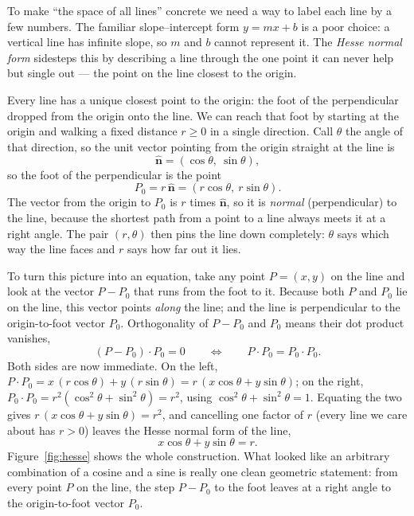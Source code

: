 To make ``the space of all lines'' concrete we need a way to label each line by a
few numbers. The familiar slope--intercept form $y = mx + b$ is a poor choice: a
vertical line has infinite slope, so $m$ and $b$ cannot represent it. The
\emph{Hesse normal form} sidesteps this by describing a line through the one point
it can never help but single out --- the point on the line closest to the origin.

Every line has a unique closest point to the origin: the foot of the perpendicular
dropped from the origin onto the line. We can reach that foot by starting at the
origin and walking a fixed distance $r \ge 0$ in a single direction. Call $\theta$
the angle of that direction, so the unit vector pointing from the origin straight
at the line is
\begin{equation}
  \hat{\mathbf n} = (\cos\theta,\ \sin\theta),
  \label{eq:unit-normal}
\end{equation}
\noindent
so the foot of the perpendicular is the point
\begin{equation}
  P_0 = r\,\hat{\mathbf n} = (r\cos\theta,\ r\sin\theta).
  \label{eq:foot}
\end{equation}
\noindent
The vector from the origin to $P_0$ is $r$ times $\hat{\mathbf n}$, so it is
\emph{normal} (perpendicular) to the line, because the shortest path from a point
to a line always meets it at a right angle. The pair $(r,\theta)$ then pins the
line down completely: $\theta$ says which way the line faces and $r$ says how far
out it lies.

To turn this picture into an equation, take any point $P = (x,y)$ on the line and
look at the vector $P - P_0$ that runs from the foot to it. Because both $P$ and
$P_0$ lie on the line, this vector points \emph{along} the line; and the line is
perpendicular to the origin-to-foot vector $P_0$. Orthogonality of $P - P_0$ and
$P_0$ means their dot product vanishes,
\begin{equation}
  (P - P_0)\cdot P_0 = 0
  \qquad\Longleftrightarrow\qquad
  P\cdot P_0 = P_0\cdot P_0 .
  \label{eq:ortho}
\end{equation}
\noindent
Both sides are now immediate. On the left,
$P\cdot P_0 = x\,(r\cos\theta) + y\,(r\sin\theta) = r\,(x\cos\theta + y\sin\theta)$;
on the right,
$P_0\cdot P_0 = r^2(\cos^2\theta + \sin^2\theta) = r^2$, using
$\cos^2\theta + \sin^2\theta = 1$. Equating the two gives
$r\,(x\cos\theta + y\sin\theta) = r^2$, and cancelling one factor of $r$ (every
line we care about has $r > 0$) leaves the Hesse normal form of the line,
\begin{equation}
  x\cos\theta + y\sin\theta = r .
  \label{eq:line-rtheta}
\end{equation}
\noindent
Figure~\ref{fig:hesse} shows the whole construction. What looked like an arbitrary
combination of a cosine and a sine is really one clean geometric statement: from
every point $P$ on the line, the step $P - P_0$ to the foot leaves at a right angle
to the origin-to-foot vector $P_0$.

